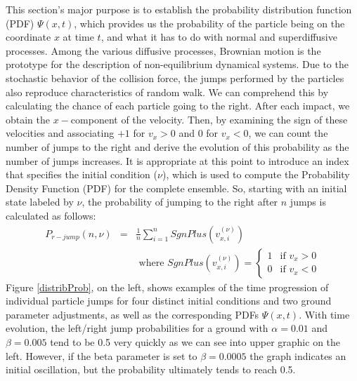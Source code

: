 \documentclass[reprint, aps, pre,nofootinbib]{revtex4-1}
\begin{document}
This section's major purpose is to establish the probability distribution
function (PDF) $\Psi(x,t)$, which provides us the probability of
the particle being on the coordinate $x$ at time $t$, and what it
has to do with normal and superdiffusive processes. Among the various
diffusive processes, Brownian motion is the prototype for the description
of non-equilibrium dynamical systems. Due to the stochastic behavior
of the collision force, the jumps performed by the particles also
reproduce characteristics of random walk. We can comprehend this by
calculating the chance of each particle going to the right. After
each impact, we obtain the $x-$component of the velocity. Then, by
examining the sign of these velocities and associating $+1$ for $v_{x}>0$
and $0$ for $v_{x}<0$, we can count the number of jumps to the right
and derive the evolution of this probability as the number of jumps
increases. It is appropriate at this point to introduce an index that
specifies the initial condition ($\nu$), which is used to compute
the Probability Density Function (PDF) for the complete ensemble.
So, starting with an initial state labeled by $\nu$, the probability
of jumping to the right after $n$ jumps is calculated as follows:
\begin{eqnarray*}
P_{r-jump}(n,\nu) & = & \frac{1}{n}\sum_{i=1}^{n}SgnPlus(v_{x,i}^{(\nu)})\\
 &  & \textrm{ where }SgnPlus(v_{x,i}^{(\nu)})=\begin{cases}
1 & \textrm{if }v_{x}>0\\
0 & \textrm{if }v_{x}<0
\end{cases}
\end{eqnarray*}
Figure \ref{distribProb}, on the left, shows examples of the time
progression of individual particle jumps for four distinct initial
conditions and two ground parameter adjustments, as well as the corresponding
PDFs $\Psi(x,t)$. With time evolution, the left/right jump probabilities
for a ground with $\alpha=0.01$ and $\beta=0.005$ tend to be 0.5
very quickly as we can see into upper graphic on the left. However,
if the beta parameter is set to $\beta=0.0005$ the graph indicates
an initial oscillation, but the probability ultimately tends to reach
0.5. 
\end{document}
